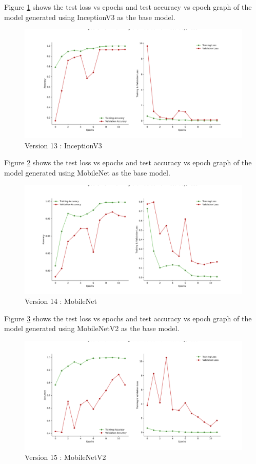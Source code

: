 Figure \ref{fig:inceptionv3} shows the test loss vs epochs and test accuracy vs epoch graph of the model generated using InceptionV3 as the base model.
\begin{figure}[H]
\includegraphics[scale=0.29]{Photos/InceptionV3_plot.png}
\caption{Version 13 : InceptionV3} \label{fig:inceptionv3}
\end{figure}
Figure \ref{fig:mnet} shows the test loss vs epochs and test accuracy vs epoch graph of the model generated using MobileNet as the base model.
\begin{figure}[H]
\includegraphics[scale=0.29]{Photos/MobileNet_plot.png}
\caption{Version 14 : MobileNet} \label{fig:mnet}
\end{figure}
Figure \ref{fig:mnetv2} shows the test loss vs epochs and test accuracy vs epoch graph of the model generated using MobileNetV2 as the base model.
\begin{figure}[H]
\includegraphics[scale=0.29]{Photos/MobileNetV2_plot.png}
\caption{Version 15 : MobileNetV2} \label{fig:mnetv2}
\end{figure}
